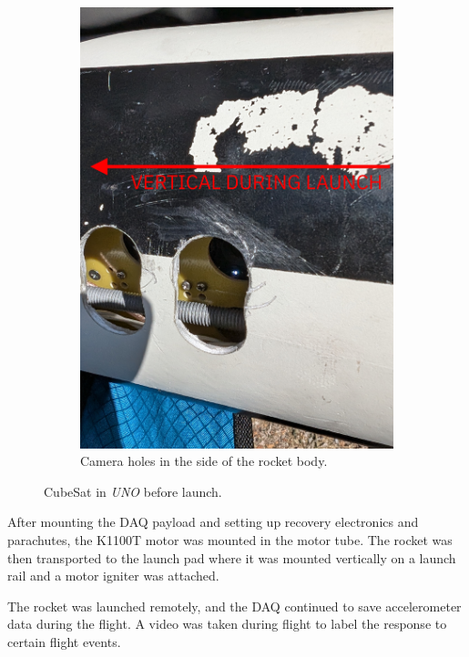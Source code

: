 \documentclass[]{report}
\begin{document}
\begin{figure}[H]
\begin{subfigure}{0.495\textwidth}
  \end{subfigure}
  \begin{subfigure}{0.495\textwidth}
    \centering
    \includegraphics[width=\linewidth]{images/camera-holes.jpg}
    \caption{Camera holes in the side of the rocket body.}
  \end{subfigure}
  \caption{CubeSat in \textit{UNO} before launch.}
  \label{fig:hpr-mounting}
\end{figure}

After mounting the DAQ payload and setting up recovery electronics and parachutes, the K1100T motor was mounted in the motor tube. The rocket was then transported to the launch pad where it was mounted vertically on a launch rail and a motor igniter was attached.

The rocket was launched remotely, and the DAQ continued to save accelerometer data during the flight. A video was taken during flight to label the response to certain flight events.
\end{document}
